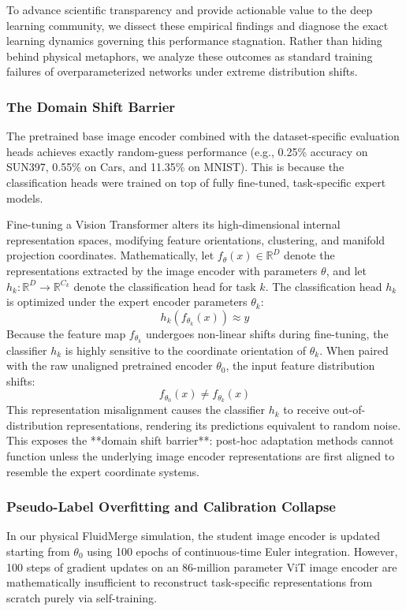 To advance scientific transparency and provide actionable value to the deep learning community, we dissect these empirical findings and diagnose the exact learning dynamics governing this performance stagnation. Rather than hiding behind physical metaphors, we analyze these outcomes as standard training failures of overparameterized networks under extreme distribution shifts.

\subsubsection{The Domain Shift Barrier}
The pretrained base image encoder combined with the dataset-specific evaluation heads achieves exactly random-guess performance (e.g., 0.25\% accuracy on SUN397, 0.55\% on Cars, and 11.35\% on MNIST). This is because the classification heads were trained on top of fully fine-tuned, task-specific expert models.

Fine-tuning a Vision Transformer alters its high-dimensional internal representation spaces, modifying feature orientations, clustering, and manifold projection coordinates. Mathematically, let $f_{\theta}(x) \in \mathbb{R}^D$ denote the representations extracted by the image encoder with parameters $\theta$, and let $h_k: \mathbb{R}^D \rightarrow \mathbb{R}^{C_k}$ denote the classification head for task $k$. The classification head $h_k$ is optimized under the expert encoder parameters $\theta_k$:
\begin{equation}
    h_k(f_{\theta_k}(x)) \approx y
\end{equation}
Because the feature map $f_{\theta_k}$ undergoes non-linear shifts during fine-tuning, the classifier $h_k$ is highly sensitive to the coordinate orientation of $\theta_k$. When paired with the raw unaligned pretrained encoder $\theta_0$, the input feature distribution shifts:
\begin{equation}
    f_{\theta_0}(x) \neq f_{\theta_k}(x)
\end{equation}
This representation misalignment causes the classifier $h_k$ to receive out-of-distribution representations, rendering its predictions equivalent to random noise. This exposes the **domain shift barrier**: post-hoc adaptation methods cannot function unless the underlying image encoder representations are first aligned to resemble the expert coordinate systems.

\subsubsection{Pseudo-Label Overfitting and Calibration Collapse}
In our physical FluidMerge simulation, the student image encoder is updated starting from $\theta_0$ using 100 epochs of continuous-time Euler integration. However, 100 steps of gradient updates on an 86-million parameter ViT image encoder are mathematically insufficient to reconstruct task-specific representations from scratch purely via self-training.

